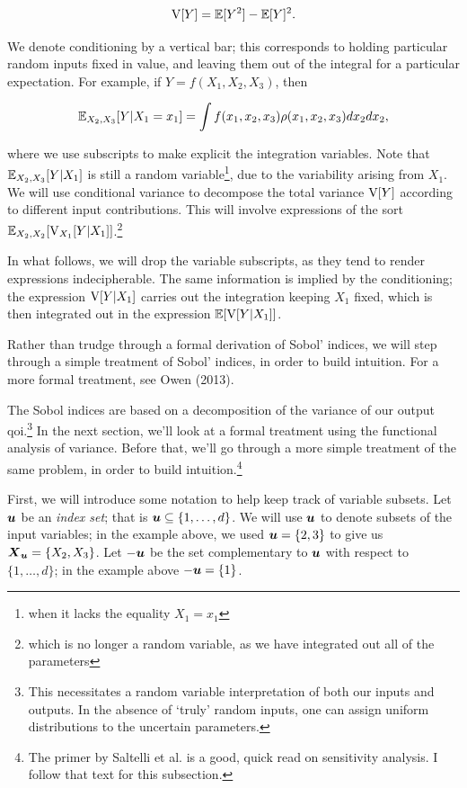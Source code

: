 \documentclass[../primer.tex]{subfiles}
\begin{document}
\begin{equation}
  \mathrm{V}[Y] = \mathbb{E}[Y^2] - \mathbb{E}[Y]^2.
\end{equation}

We denote conditioning by a vertical bar; this corresponds to holding particular
random inputs fixed in value, and leaving them out of the integral for a
particular expectation. For example, if $Y=f(X_1,X_2,X_3)$, then

\begin{equation}
  \mathbb{E}_{X_2,X_3}[Y|X_1=x_1] = \int f(x_1,x_2,x_3)\rho(x_1,x_2,x_3)dx_2dx_2,
\end{equation}

\noindent where we use subscripts to make explicit the integration variables.
Note that $\mathbb{E}_{X_2,X_3}[Y|X_1]$ is still a random variable\footnote{when it
  lacks the equality $X_1=x_1$}, due to the variability arising from $X_1$. We
will use conditional variance to decompose the total variance $\mathrm{V}[Y]$ according
to different input contributions. This will involve expressions of the sort
$\mathbb{E}_{X_2,X_2}[\mathrm{V}_{X_1}[Y|X_1]]$.\footnote{which is no longer a random variable,
  as we have integrated out all of the parameters}

In what follows, we will drop the variable subscripts, as they tend to render
expressions indecipherable. The same information is implied by the conditioning;
the expression $\mathrm{V}[Y|X_1]$ carries out the integration keeping $X_1$ fixed,
which is then integrated out in the expression $\mathbb{E}[\mathrm{V}[Y|X_1]]$.

Rather than trudge through a formal derivation of Sobol' indices, we will step
through a simple treatment of Sobol' indices, in order to build intuition. For a
more formal treatment, see Owen (2013).\cite{owen2013variance}

The Sobol indices are based on a decomposition of the variance of our output
qoi.\footnote{This necessitates a random variable interpretation of both our
  inputs and outputs. In the absence of `truly' random inputs, one can assign
  uniform distributions to the uncertain parameters.} In the next section, we'll
look at a formal treatment using the functional analysis of variance. Before
that, we'll go through a more simple treatment of the same problem, in order to
build intuition.\footnote{The primer by Saltelli et
  al.\cite{saltelli2004sensitivity} is a good, quick read on sensitivity
  analysis. I follow that text for this subsection.}

First, we will introduce some notation to help keep track of variable subsets.
Let $\boldsymbol{u}$ be an \emph{index set}; that is $\boldsymbol{u}\subseteq\{1,\dots,d\}$. We will
use $\boldsymbol{u}$ to denote subsets of the input variables; in the example above, we
used $\boldsymbol{u}=\{2,3\}$ to give us $\boldsymbol{X}_{\boldsymbol{u}}=\{X_2,X_3\}$. Let $-\boldsymbol{u}$ be the set
complementary to $\boldsymbol{u}$ with respect to $\{1,\dots,d\}$; in the example above
$-\boldsymbol{u}=\{1\}$.
\end{document}

